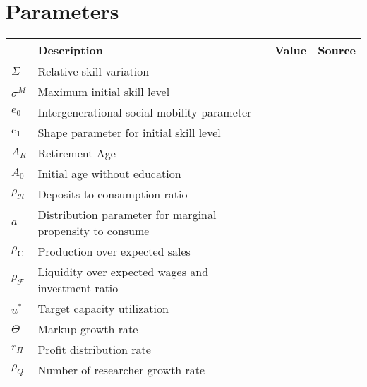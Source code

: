 \documentclass[a4paper, headings=standardclasses]{scrartcl}
\begin{document}

\section{Parameters}

\begin{tabularx}{\linewidth}{lXll}
	\toprule
	                   & Description                                               & Value & Source \\
	\midrule
	$\Sigma$           & Relative skill variation                                  &       &        \\
	$\sigma^M$         & Maximum initial skill level                               &       &        \\
	$e_0$              & Intergenerational social mobility parameter               &       &        \\
	$e_1$              & Shape parameter for initial skill level                   &       &        \\
	$A_R$              & Retirement Age                                            &       &        \\
	$A_0$              & Initial age without education                             &       &        \\
	$\rho_\mathcal{H}$ & Deposits to consumption ratio                             &       &        \\
	$a$                & Distribution parameter for marginal propensity to consume &       &        \\
	$\rho_\mathbf{C}$  & Production over expected sales                            &       &        \\
	$\rho_\mathcal{F}$ & Liquidity over expected wages and investment ratio        &       &        \\
	$u^*$              & Target capacity utilization                               &       &        \\
	$\Theta$           & Markup growth rate                                        &       &        \\
	$r_\Pi$            & Profit distribution rate                                  &       &        \\
	$\rho_Q$           & Number of researcher growth rate                          &       &        \\

\end{tabularx}
\end{document}
